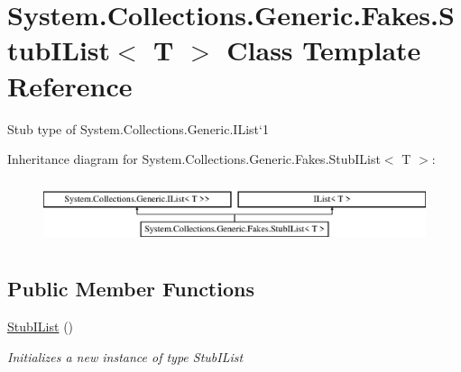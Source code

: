 \hypertarget{class_system_1_1_collections_1_1_generic_1_1_fakes_1_1_stub_i_list_3_01_t_01_4}{\section{System.\-Collections.\-Generic.\-Fakes.\-Stub\-I\-List$<$ T $>$ Class Template Reference}
\label{class_system_1_1_collections_1_1_generic_1_1_fakes_1_1_stub_i_list_3_01_t_01_4}
}


Stub type of System.\-Collections.\-Generic.\-I\-List`1 


Inheritance diagram for System.\-Collections.\-Generic.\-Fakes.\-Stub\-I\-List$<$ T $>$\-:\begin{figure}[H]
\begin{center}
\leavevmode
\includegraphics[height=1.898305cm]{class_system_1_1_collections_1_1_generic_1_1_fakes_1_1_stub_i_list_3_01_t_01_4}
\end{center}
\end{figure}
\subsection*{Public Member Functions}
\begin{DoxyCompactItemize}
\item 
\hyperlink{class_system_1_1_collections_1_1_generic_1_1_fakes_1_1_stub_i_list_3_01_t_01_4_a7e2e725eec24b278fd16ce674754e632}{Stub\-I\-List} ()
\begin{DoxyCompactList}\small\item\em Initializes a new instance of type Stub\-I\-List\end{DoxyCompactList}\end{DoxyCompactItemize}
